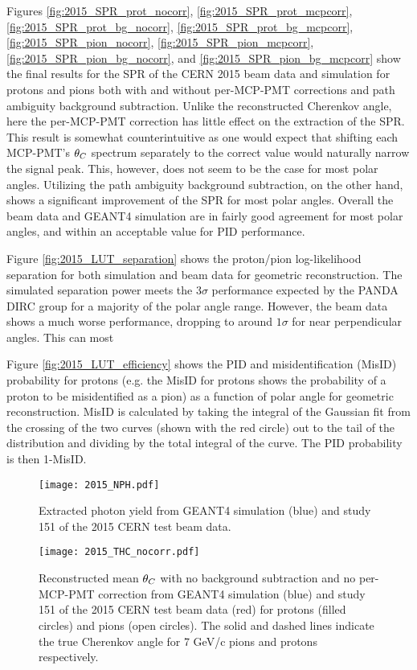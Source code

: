 Figures \ref{fig:2015_SPR_prot_nocorr}, \ref{fig:2015_SPR_prot_mcpcorr}, \ref{fig:2015_SPR_prot_bg_nocorr}, \ref{fig:2015_SPR_prot_bg_mcpcorr}, \ref{fig:2015_SPR_pion_nocorr}, \ref{fig:2015_SPR_pion_mcpcorr}, \ref{fig:2015_SPR_pion_bg_nocorr}, and \ref{fig:2015_SPR_pion_bg_mcpcorr} show the final results for the SPR of the CERN 2015 beam data and simulation for protons and pions both with and without per-MCP-PMT corrections and path ambiguity background subtraction. Unlike the reconstructed Cherenkov angle, here the per-MCP-PMT correction has little effect on the extraction of the SPR. This result is somewhat counterintuitive as one would expect that shifting each MCP-PMT's $\theta_{C}$ spectrum separately to the correct value would naturally narrow the signal peak. This, however, does not seem to be the case for most polar angles. Utilizing the path ambiguity background subtraction, on the other hand, shows a significant improvement of the SPR for most polar angles. Overall the beam data and GEANT4 simulation are in fairly good agreement for most polar angles, and within an acceptable value for PID performance.

Figure \ref{fig:2015_LUT_separation} shows the proton/pion log-likelihood separation for both simulation and beam data for geometric reconstruction. The simulated separation power meets the $3\sigma$ performance expected by the PANDA DIRC group for a majority of the polar angle range. However, the beam data shows a much worse performance, dropping to around $1\sigma$ for near perpendicular angles. This can most 

Figure \ref{fig:2015_LUT_efficiency} shows the PID and misidentification (MisID) probability for protons (e.g. the MisID for protons shows the probability of a proton to be misidentified as a pion) as a function of polar angle for geometric reconstruction. MisID is calculated by taking the integral of the Gaussian fit from the crossing of the two curves (shown with the red circle) out to the tail of the distribution and dividing by the total integral of the curve. The PID probability is then 1-MisID.

\begin{figure}[!htb]
	\centering
	\texttt{[image: 2015\_NPH.pdf]}
	\caption{Extracted photon yield from GEANT4 simulation (blue) and study 151 of the 2015 CERN test beam data.}
	\label{fig:2015_NPH}
\end{figure}

\begin{figure}[!htb]
	\centering
	\texttt{[image: 2015\_THC\_nocorr.pdf]}
	\caption{Reconstructed mean $\theta_{C}$ with no background subtraction and no per-MCP-PMT correction from GEANT4 simulation (blue) and study 151 of the 2015 CERN test beam data (red) for protons (filled circles) and pions (open circles). The solid and dashed lines indicate the true Cherenkov angle for 7 GeV/c pions and protons respectively.}
	\label{fig:2015_THC_nocorr}
\end{figure}

